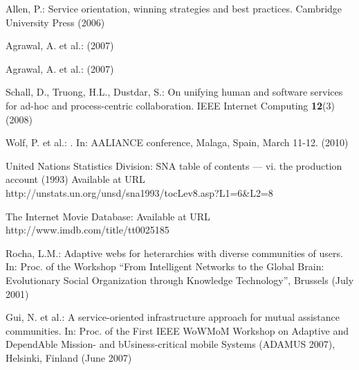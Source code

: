 \documentclass{llncs}
\begin{document}
\begin{thebibliography}{10}
Allen, P.:
\newblock Service orientation, winning strategies and best practices.
\newblock Cambridge University Press (2006)

Agrawal, A. et al.:
 (2007)

Agrawal, A. et al.:
 (2007)

Schall, D., Truong, H.L., Dustdar, S.:
\newblock On unifying human and software services for ad-hoc and
  process-centric collaboration.
\newblock IEEE Internet Computing \textbf{12}(3) (2008)

Wolf, P. et al.:
.
\newblock In: AALIANCE conference, Malaga, Spain, March 11-12. (2010)

	United Nations Statistics Division:
 {SNA} table of contents --- vi. the production account (1993)
\newblock Available at URL http://unstats.un.org/unsd/sna1993/to\-cLev8.asp?L1=6\&L2=8

	The Internet Movie Database:
\newblock Available at URL http://www.imdb.com/title/tt0025185

Rocha, L.M.:
\newblock Adaptive webs for heterarchies with diverse communities of users.
\newblock In: Proc. of the Workshop ``From Intelligent Networks to the Global
  Brain: Evolutionary Social Organization through Knowledge Technology'',
  Brussels (July 2001)

Gui, N. et al.:
\newblock A service-oriented infrastructure approach for mutual assistance
  communities.
\newblock In: Proc. of the First IEEE WoWMoM Workshop on Adaptive and
  DependAble Mission- and bUsiness-critical mobile Systems (ADAMUS 2007),
  Helsinki, Finland (June 2007)

\end{thebibliography}
\end{document}
